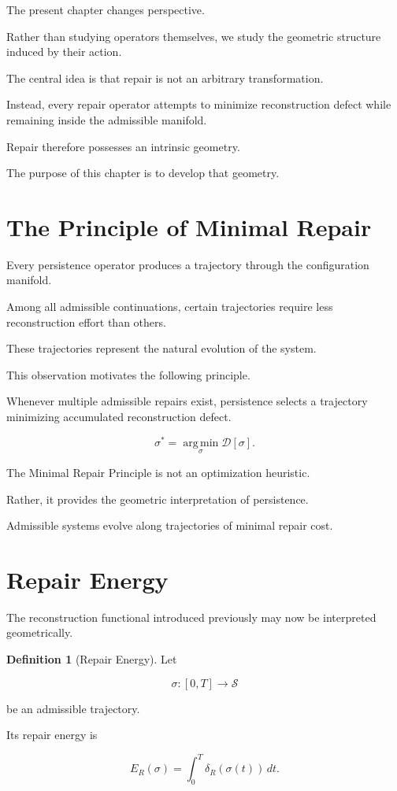 \documentclass[11pt]{book}
\numberwithin{equation}{chapter}
\theoremstyle{definition}
\newtheorem{definition}{Definition}[chapter]
\theoremstyle{plain}
\begin{document}
The present chapter changes perspective.

Rather than studying operators themselves, we study the geometric
structure induced by their action.

The central idea is that repair is not an arbitrary transformation.

Instead, every repair operator attempts to minimize reconstruction
defect while remaining inside the admissible manifold.

Repair therefore possesses an intrinsic geometry.

The purpose of this chapter is to develop that geometry.

\section{The Principle of Minimal Repair}

Every persistence operator produces a trajectory through the
configuration manifold.

Among all admissible continuations, certain trajectories require
less reconstruction effort than others.

These trajectories represent the natural evolution of the system.

This observation motivates the following principle.

\begin{axiom}

Whenever multiple admissible repairs exist, persistence selects a
trajectory minimizing accumulated reconstruction defect.

\[
\sigma^*
=
\operatorname*{arg\,min}_{\sigma}
\mathcal D[\sigma].
\]

\end{axiom}

The Minimal Repair Principle is not an optimization heuristic.

Rather, it provides the geometric interpretation of persistence.

Admissible systems evolve along trajectories of minimal repair cost.

\section{Repair Energy}

The reconstruction functional introduced previously may now be
interpreted geometrically.

\begin{definition}[Repair Energy]

Let

\[
\sigma:[0,T]\rightarrow\mathcal S
\]

be an admissible trajectory.

Its repair energy is

\[
E_R(\sigma)
=
\int_0^T
\delta_R(\sigma(t))
\,dt.
\]

\end{definition}
\end{document}
